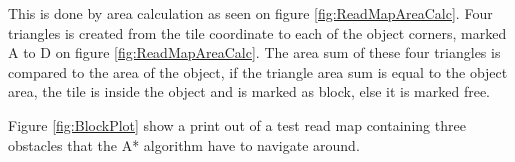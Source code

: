 This is done by area calculation as seen on figure \ref{fig:ReadMapAreaCalc}.
Four triangles is created from the tile coordinate to each of the object corners, marked A to D on figure \ref{fig:ReadMapAreaCalc}.
The area sum of these four triangles is compared to the area of the object, if the triangle area sum is equal to the object area, the tile is inside the object and is marked as block, else it is marked free.


Figure \ref{fig:BlockPlot} show a print out of a test read map containing three obstacles that the A* algorithm have to navigate around.


\pagebreak
